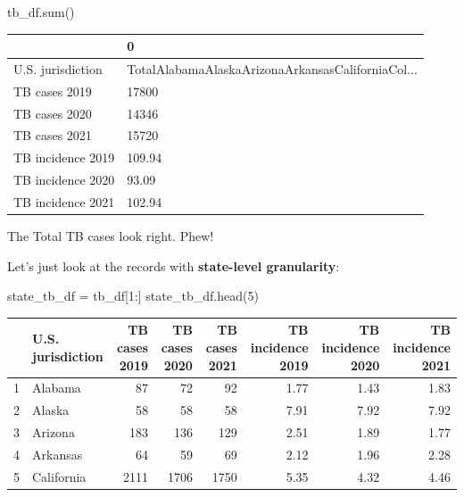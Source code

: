 \documentclass[
  letterpaper,
  DIV=11,
  numbers=noendperiod]{scrreprt}
\newenvironment{Shaded}{\begin{snugshade}}{\end{snugshade}}
\newcommand{\BuiltInTok}[1]{\textcolor[rgb]{0.00,0.23,0.31}{#1}}
\newcommand{\DecValTok}[1]{\textcolor[rgb]{0.68,0.00,0.00}{#1}}
\newcommand{\NormalTok}[1]{\textcolor[rgb]{0.00,0.23,0.31}{#1}}
\newcommand{\OperatorTok}[1]{\textcolor[rgb]{0.37,0.37,0.37}{#1}}
\begin{document}
\begin{Shaded}
\begin{Highlighting}[]
\NormalTok{tb\_df.}\BuiltInTok{sum}\NormalTok{()}
\end{Highlighting}
\end{Shaded}

\begin{tabular}{ll}
\toprule
{} &                                                  0 \\
\midrule
U.S. jurisdiction &  TotalAlabamaAlaskaArizonaArkansasCaliforniaCol... \\
TB cases 2019     &                                              17800 \\
TB cases 2020     &                                              14346 \\
TB cases 2021     &                                              15720 \\
TB incidence 2019 &                                             109.94 \\
TB incidence 2020 &                                              93.09 \\
TB incidence 2021 &                                             102.94 \\
\bottomrule
\end{tabular}

The Total TB cases look right. Phew!

Let's just look at the records with \textbf{state-level granularity}:

\begin{Shaded}
\begin{Highlighting}[]
\NormalTok{state\_tb\_df }\OperatorTok{=}\NormalTok{ tb\_df[}\DecValTok{1}\NormalTok{:]}
\NormalTok{state\_tb\_df.head(}\DecValTok{5}\NormalTok{)}
\end{Highlighting}
\end{Shaded}

\begin{tabular}{llrrrrrr}
\toprule
{} & U.S. jurisdiction &  TB cases 2019 &  TB cases 2020 &  TB cases 2021 &  TB incidence 2019 &  TB incidence 2020 &  TB incidence 2021 \\
\midrule
1 &           Alabama &             87 &             72 &             92 &               1.77 &               1.43 &               1.83 \\
2 &            Alaska &             58 &             58 &             58 &               7.91 &               7.92 &               7.92 \\
3 &           Arizona &            183 &            136 &            129 &               2.51 &               1.89 &               1.77 \\
4 &          Arkansas &             64 &             59 &             69 &               2.12 &               1.96 &               2.28 \\
5 &        California &           2111 &           1706 &           1750 &               5.35 &               4.32 &               4.46 \\
\bottomrule
\end{tabular}
\end{document}
